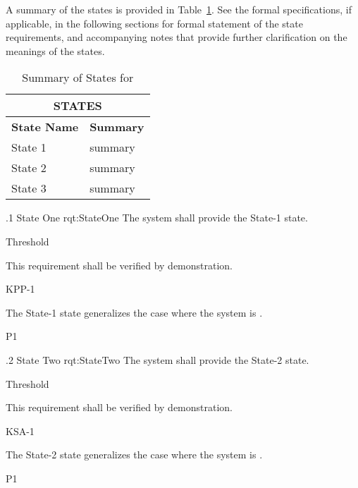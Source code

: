 A summary of the states is provided in Table~\ref{tab:States}.
See the formal specifications, if applicable, in the following sections for formal statement of the state requirements, and accompanying notes that provide further clarification on the meanings of the states.

\begin{table}[h]
	\begin{center}
		\begin{tabular}{|p{1.0in}|p{5.0in}|}
			\hline
			\hline
			\multicolumn{2}{|c|}{{\bf STATES}} \\
			\hline
				{\bf State Name} & {\bf Summary} \\
			\hline
			\hline
State 1 & summary \\ \hline
State 2 & summary \\ \hline
State 3 & summary \\ 
			\hline
			\hline
		\end{tabular}
		\caption{Summary of States for \ThisSystem}
		\label{tab:States}
	\end{center}
\end{table}


\ONERQMTVKPP
{\RqtNumberBase.1}
{State One}
{rqt:StateOne}
{The system shall provide the State-1 state.}
{
	\item [Phase 1] Threshold
}
{This requirement shall be verified by demonstration.}
{
	\item [\cite{ref__KNEAD_Manual}] KPP-1
}
{
	\item The State-1 state generalizes the case where the system is \TBD.
}
{P1}


\ONERQMTVKSA
{\RqtNumberBase.2}
{State Two}
{rqt:StateTwo}
{The system shall provide the State-2 state.}
{
	\item [Phase 1] Threshold
}
{This requirement shall be verified by demonstration.}
{
	\item [\cite{ref__KNEAD_Manual}] KSA-1
}
{
	\item The State-2 state generalizes the case where the system is \TBD.
}
{P1}


